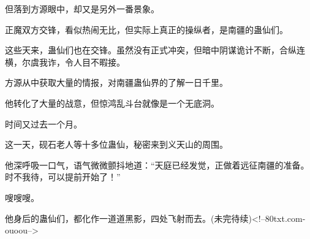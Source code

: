 \begin{this_body}
但落到方源眼中，却又是另外一番景象。

正魔双方交锋，看似热闹无比，但实际上真正的操纵者，是南疆的蛊仙们。

这些天来，蛊仙们也在交锋。虽然没有正式冲突，但暗中阴谋诡计不断，合纵连横，尔虞我诈，令人目不暇接。

方源从中获取大量的情报，对南疆蛊仙界的了解一日千里。

他转化了大量的战意，但惊鸿乱斗台就像是一个无底洞。

时间又过去一个月。

这一天，砚石老人等十多位蛊仙，秘密来到义天山的周围。

他深呼吸一口气，语气微微颤抖地道：“天庭已经发觉，正做着远征南疆的准备。时不我待，可以提前开始了！”

嗖嗖嗖。

他身后的蛊仙们，都化作一道道黑影，四处飞射而去。(未完待续)<!--80txt.com-ouoou-->

\end{this_body}

